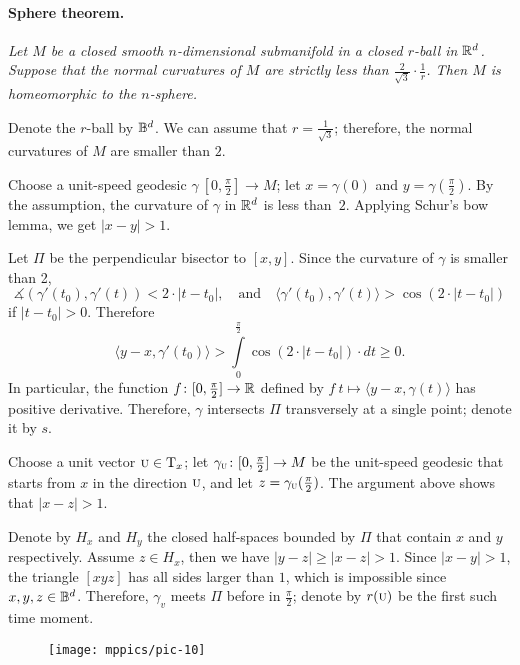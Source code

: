 \documentclass[a4paper,10pt]{article}
\begin{document}
\paragraph{Sphere theorem.}
\label{thm:strict}
\textit{Let $M$ be a closed smooth $n$-dimensional submanifold in a closed $r$-ball in $\mathbb{R}^d$.
Suppose that the normal curvatures of $M$ are strictly less than $\tfrac2{\sqrt{3}}\cdot\tfrac1r$.
Then $M$ is homeomorphic to the $n$-sphere.}


Denote the $r$-ball by $\mathbb{B}^d$.
We can assume that $r=\tfrac1{\sqrt{3}}$;
therefore, the normal curvatures of $M$ are smaller than $2$.

Choose a unit-speed geodesic $\gamma\:[0,\tfrac\pi2]\to M$;
let $x=\gamma(0)$ and $y=\gamma(\tfrac\pi2)$.
By the assumption, the curvature of $\gamma$ in $\mathbb{R}^d$ is less than~$2$.
Applying Schur's bow lemma, we get $|x-y|>1$.

Let $\Pi$ be the perpendicular bisector to $[x,y]$.
Since the curvature of $\gamma$ is smaller than 2,
\[\measuredangle(\gamma'(t_0),\gamma'(t))< 2\cdot|t-t_0|,
\quad\text{and}\quad
\langle \gamma'(t_0),\gamma'(t) \rangle> \cos (2\cdot|t-t_0|)\] if $|t-t_0|>0$.
Therefore
\[\langle y-x,\gamma'(t_0) \rangle>\int\limits_0^{\frac\pi2}\cos (2\cdot |t-t_0|)\cdot dt\ge0.\]
In particular, the function $f\colon[0,\tfrac\pi2]\to\mathbb{R}$ defined by
$f\:t\mapsto \langle y-x,\gamma(t) \rangle$
has positive derivative.
Therefore, $\gamma$ intersects $\Pi$ transversely at a single point;
denote it by $s$.



Choose a unit vector ${\normalfont\textsc{u}}\in\mathrm{T}_x$;
let $\gamma_{{\normalfont\textsc{u}}}\colon[0,\tfrac\pi2]\to M$ be the unit-speed geodesic that starts from $x$ in the direction ${{\normalfont\textsc{u}}}$, and let $z=\gamma_{{\normalfont\textsc{u}}}(\tfrac\pi2)$.
The argument above shows that $|x-z|>1$.

Denote by $H_x$ and $H_y$ the closed half-spaces bounded by $\Pi$ that contain $x$ and $y$ respectively.
Assume $z\in H_x$, then we have $|y-z|\ge |x-z|>1$.
Since $|x-y|>1$, the triangle $[xyz]$ has all sides larger than $1$,
which is impossible since $x,y,z\in \mathbb{B}^d$.
Therefore, $\gamma_v$ meets $\Pi$ before in $\tfrac\pi2$;
denote by $r({{\normalfont\textsc{u}}})$ be the first such time moment.

\begin{wrapfigure}{r}{36 mm}
\vskip-4mm
\centering
\texttt{[image: mppics/pic-10]}
\vskip0mm
\end{wrapfigure}
\end{document}
